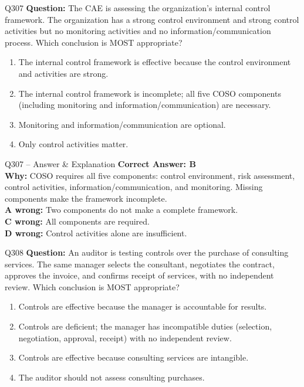 \documentclass[aspectratio=169,10pt]{beamer}
\begin{document}
	\begin{frame}[t]{Q307}
		\small
		\textbf{Question:} The CAE is assessing the organization's internal control framework. The organization has a strong control environment and strong control activities but no monitoring activities and no information/communication process. Which conclusion is MOST appropriate?
		\begin{enumerate}[label=\Alph*.,itemsep=1pt,topsep=2pt]
			\item The internal control framework is effective because the control environment and activities are strong.
			\item The internal control framework is incomplete; all five COSO components (including monitoring and information/communication) are necessary.
			\item Monitoring and information/communication are optional.
			\item Only control activities matter.
		\end{enumerate}
	\end{frame}
	
	\begin{frame}[t]{Q307 -- Answer \& Explanation}
		\small
		\textbf{Correct Answer: B} \\[4pt]
		\textbf{Why:} COSO requires all five components: control environment, risk assessment, control activities, information/communication, and monitoring. Missing components make the framework incomplete. \\[4pt]
		\textbf{A wrong:} Two components do not make a complete framework. \\[2pt]
		\textbf{C wrong:} All components are required. \\[2pt]
		\textbf{D wrong:} Control activities alone are insufficient.
	\end{frame}
	
	\begin{frame}[t]{Q308}
		\small
		\textbf{Question:} An auditor is testing controls over the purchase of consulting services. The same manager selects the consultant, negotiates the contract, approves the invoice, and confirms receipt of services, with no independent review. Which conclusion is MOST appropriate?
		\begin{enumerate}[label=\Alph*.,itemsep=1pt,topsep=2pt]
			\item Controls are effective because the manager is accountable for results.
			\item Controls are deficient; the manager has incompatible duties (selection, negotiation, approval, receipt) with no independent review.
			\item Controls are effective because consulting services are intangible.
			\item The auditor should not assess consulting purchases.
		\end{enumerate}
	\end{frame}
	
\end{document}
